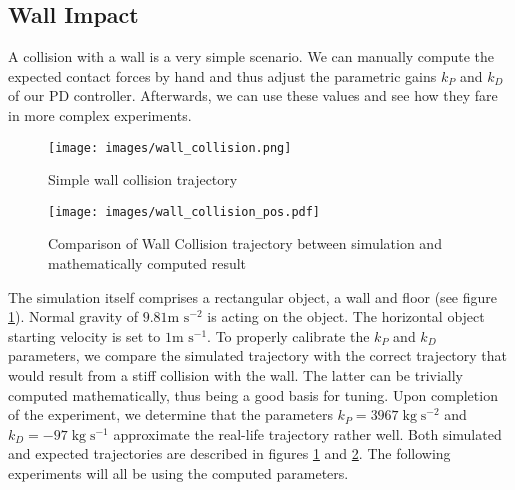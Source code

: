 \subsection{Wall Impact} \label{sec:experimental_tuning}
%
A collision with a wall is a very simple scenario. We can manually compute the expected contact forces by hand and thus adjust the parametric gains $k_P$ and $k_D$ of our PD controller. Afterwards, we can use these values and see how they fare in more complex experiments.

\begin{figure}%
	\centering
	\texttt{[image: images/wall\_collision.png]}
	\caption{Simple wall collision trajectory}
	\label{fig:wall_collision}
\end{figure}%
\begin{figure}%
	\centering
	\texttt{[image: images/wall\_collision\_pos.pdf]}
	\caption{Comparison of Wall Collision trajectory between simulation and mathematically computed result}
	\label{fig:wall_collision_graph}
\end{figure}

The simulation itself comprises a rectangular object, a wall and floor (see figure \ref{fig:wall_collision}). Normal gravity of $9.81 \text{m s}^{-2}$ is acting on the object. The horizontal object starting velocity is set to $1\text{m s}^{-1}$.
To properly calibrate the $k_P$ and $k_D$ parameters, we compare the simulated trajectory with the correct trajectory that would result from a stiff collision with the wall. The latter can be trivially computed mathematically, thus being a good basis for tuning. Upon completion of the experiment, we determine that the parameters $k_P = 3967\;\text{kg}\;\text{s}^{-2}$ and $k_D = -97\;\text{kg}\;\text{s}^{-1}$
approximate the real-life trajectory rather well. Both simulated and expected trajectories are described in figures \ref{fig:wall_collision} and \ref{fig:wall_collision_graph}. The following experiments will all be using the computed parameters. 